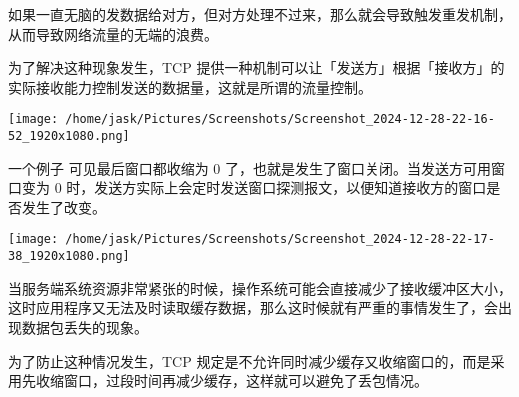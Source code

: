 \documentclass[11pt]{article}
\begin{document}
如果一直无脑的发数据给对方，但对方处理不过来，那么就会导致触发重发机制，从而导致网络流量的无端的浪费。

为了解决这种现象发生，TCP 提供一种机制可以让「发送方」根据「接收方」的实际接收能力控制发送的数据量，这就是所谓的流量控制。

\begin{center}
\texttt{[image: /home/jask/Pictures/Screenshots/Screenshot\_2024-12-28-22-16-52\_1920x1080.png]}
\end{center}
一个例子
可见最后窗口都收缩为 0 了，也就是发生了窗口关闭。当发送方可用窗口变为 0 时，发送方实际上会定时发送窗口探测报文，以便知道接收方的窗口是否发生了改变。

\begin{center}
\texttt{[image: /home/jask/Pictures/Screenshots/Screenshot\_2024-12-28-22-17-38\_1920x1080.png]}
\end{center}
当服务端系统资源非常紧张的时候，操作系统可能会直接减少了接收缓冲区大小，这时应用程序又无法及时读取缓存数据，那么这时候就有严重的事情发生了，会出现数据包丢失的现象。

为了防止这种情况发生，TCP 规定是不允许同时减少缓存又收缩窗口的，而是采用先收缩窗口，过段时间再减少缓存，这样就可以避免了丢包情况。
\end{document}
